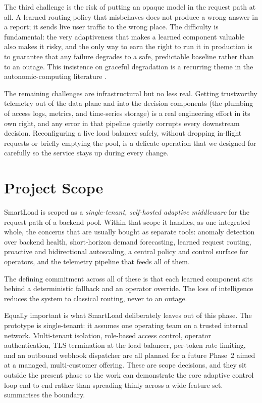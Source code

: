 The third challenge is the risk of putting an opaque model in the request path at
all. A learned routing policy that misbehaves does not produce a wrong answer in
a report; it sends live user traffic to the wrong place. The difficulty is
fundamental: the very adaptiveness that makes a learned component valuable also
makes it risky, and the only way to earn the right to run it in production is to
guarantee that any failure degrades to a safe, predictable baseline rather than
to an outage. This insistence on graceful degradation is a recurring theme in the
autonomic-computing literature \cite{kephart2003autonomic}.

The remaining challenges are infrastructural but no less real. Getting
trustworthy telemetry out of the data plane and into the decision components (the
plumbing of access logs, metrics, and time-series storage) is a real engineering
effort in its own right, and any error in that pipeline quietly corrupts every
downstream decision. Reconfiguring a live load balancer safely, without dropping
in-flight requests or briefly emptying the pool, is a delicate operation that we
designed for carefully so the service stays up during every change.

\section{Project Scope}
\label{sec:intro:scope}

SmartLoad is scoped as a \emph{single-tenant, self-hosted adaptive middleware} for
the request path of a backend pool. Within that scope it handles, as one
integrated whole, the concerns that are usually bought as separate tools: anomaly
detection over backend health, short-horizon demand forecasting, learned request
routing, proactive and bidirectional autoscaling, a central policy and control
surface for operators, and the telemetry pipeline that feeds all of them.

The defining commitment across all of these is that each learned component sits
behind a deterministic fallback and an operator override. The loss of
intelligence reduces the system to classical routing, never to an outage.

Equally important is what SmartLoad deliberately leaves out of this phase. The
prototype is single-tenant: it assumes one operating team on a trusted internal
network. Multi-tenant isolation, role-based access control, operator
authentication, TLS termination at the load balancer, per-token rate limiting,
and an outbound webhook dispatcher are all planned for a future Phase~2 aimed at a
managed, multi-customer offering. These are scope decisions, and they sit outside
the present phase so the work can demonstrate the core adaptive control loop end
to end rather than spreading thinly across a wide feature set.
 summarises the boundary.

